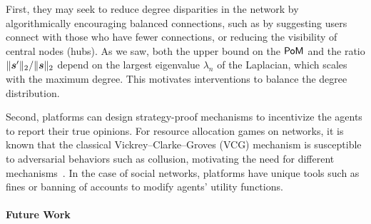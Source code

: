 First, they may seek to reduce degree disparities in the network by algorithmically encouraging balanced connections, such as by suggesting users connect with those who have fewer connections, or reducing the visibility of central nodes (hubs). As we saw, both the upper bound on the $\mathsf{PoM}$ and the ratio $\| \bm{s}^\prime \|_2 / \| \bm{s} \|_2$ depend on the largest eigenvalue $\lambda_n$ of the Laplacian, which scales with the maximum degree. This motivates interventions to balance the degree distribution. 

Second, platforms can design strategy-proof mechanisms to incentivize the agents to report their true opinions. For resource allocation games on networks, it is known that the classical Vickrey–Clarke–Groves (VCG) mechanism is susceptible to adversarial behaviors such as collusion, motivating the need for different  mechanisms~\citep{chorppath2015adversarial}. In the case of social networks, platforms have unique tools such as fines or banning of accounts to modify agents' utility functions. 




\paragraph{Future Work}

